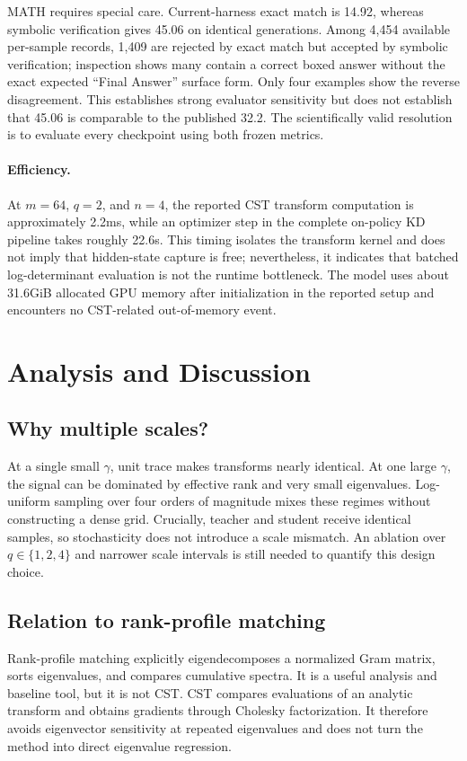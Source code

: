 \documentclass{article}
\newcommand{\cst}{\textsc{CST}}
\begin{document}
MATH requires special care.  Current-harness exact match is 14.92, whereas
symbolic verification gives 45.06 on identical generations.  Among 4,454
available per-sample records, 1,409 are rejected by exact match but accepted by
symbolic verification; inspection shows many contain a correct boxed answer
without the exact expected ``Final Answer'' surface form.  Only four examples
show the reverse disagreement.  This establishes strong evaluator sensitivity
but does not establish that 45.06 is comparable to the published 32.2.  The
scientifically valid resolution is to evaluate every checkpoint using both
frozen metrics.

\paragraph{Efficiency.}
At $m=64$, $q=2$, and $n=4$, the reported \cst{} transform computation is
approximately 2.2ms, while an optimizer step in the complete on-policy KD
pipeline takes roughly 22.6s.  This timing isolates the transform kernel and
does not imply that hidden-state capture is free; nevertheless, it indicates
that batched log-determinant evaluation is not the runtime bottleneck.  The
model uses about 31.6GiB allocated GPU memory after initialization in the
reported setup and encounters no \cst{}-related out-of-memory event.

\section{Analysis and Discussion}

\subsection{Why multiple scales?}
At a single small $\gamma$, unit trace makes transforms nearly identical.  At
one large $\gamma$, the signal can be dominated by effective rank and very
small eigenvalues.  Log-uniform sampling over four orders of magnitude mixes
these regimes without constructing a dense grid.  Crucially, teacher and
student receive identical samples, so stochasticity does not introduce a
scale mismatch.  An ablation over $q\in\{1,2,4\}$ and narrower scale intervals
is still needed to quantify this design choice.

\subsection{Relation to rank-profile matching}
Rank-profile matching explicitly eigendecomposes a normalized Gram matrix,
sorts eigenvalues, and compares cumulative spectra.  It is a useful analysis
and baseline tool, but it is not \cst{}.  \cst{} compares evaluations of an
analytic transform and obtains gradients through Cholesky factorization.  It
therefore avoids eigenvector sensitivity at repeated eigenvalues and does not
turn the method into direct eigenvalue regression.
\end{document}
